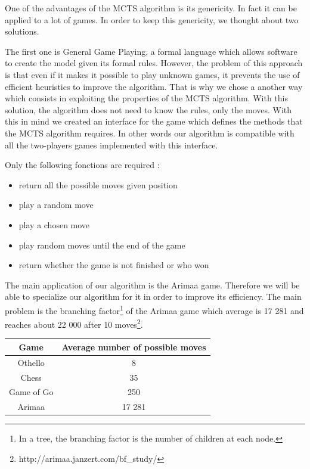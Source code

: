 One of the advantages of the MCTS algorithm is its genericity. In fact it can be applied to a lot of games. In order to keep this genericity, we thought about two solutions.

The first one is General Game Playing, a formal language which allows software to create the model given its formal rules. However, the problem of this approach is that even if it makes it possible to play unknown games, it prevents the use of efficient heuristics to improve the algorithm.
That is why we chose a another way which consists in exploiting the properties of the MCTS algorithm. 
With this solution, the algorithm does not need to know the rules, only the moves. With this in mind we created an interface for the game which defines the methods that the MCTS algorithm requires. In other words our algorithm is compatible with all the two-players games implemented with this interface.

Only the following fonctions are required : 
\begin{itemize}
\item return all the possible moves given position
\item play a random move
\item play a chosen move 
\item play random moves until the end of the game
\item return whether the game is not finished or who won
\end{itemize}

The main application of our algorithm is the Arimaa game. Therefore we will be able to specialize our algorithm for it in order to improve its efficiency. The main problem is the branching factor\footnote{In a tree, the branching factor is the number of children at each node.} of the Arimaa game which average is 17 281 and reaches about 22 000 after 10 moves\footnote{http://arimaa.janzert.com/bf\_study/}.\\

\begin{center}
	\begin{tabular}{ | c | c |}
		\hline Game & Average number of possible moves \\ \hline
		\hline  
		Othello & 8\\
		\hline  
		Chess & 35\\
		\hline  
		Game of Go & 250\\
		\hline
		Arimaa & 17 281\\
		\hline
	\end{tabular}
\end{center}


